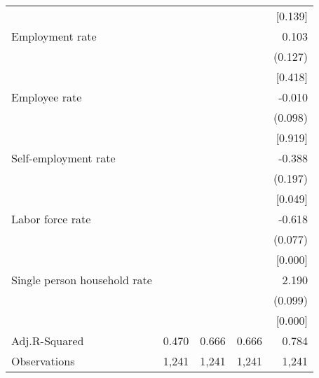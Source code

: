 {\begin{tabular}{l*{4}{D{.}{.}{-1}}}
                    &            &            &            &     [0.139]\\
Employment rate     &            &            &            &       0.103\\
                    &            &            &            &     (0.127)\\
                    &            &            &            &     [0.418]\\
Employee rate       &            &            &            &      -0.010\\
                    &            &            &            &     (0.098)\\
                    &            &            &            &     [0.919]\\
Self-employment rate&            &            &            &      -0.388\\
                    &            &            &            &     (0.197)\\
                    &            &            &            &     [0.049]\\
Labor force rate    &            &            &            &      -0.618\\
                    &            &            &            &     (0.077)\\
                    &            &            &            &     [0.000]\\
Single person household rate&            &            &            &       2.190\\
                    &            &            &            &     (0.099)\\
                    &            &            &            &     [0.000]\\
\midrule
Adj.R-Squared       &       0.470&       0.666&       0.666&       0.784\\
Observations        &       1,241&       1,241&       1,241&       1,241\\
\bottomrule
\end{tabular}
}
